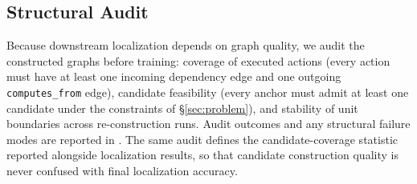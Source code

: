 \subsection{Structural Audit}
Because downstream localization depends on graph quality, we audit the constructed graphs before training: coverage of executed actions (every action must have at least one incoming dependency edge and one outgoing \texttt{computes\_from} edge), candidate feasibility (every anchor must admit at least one candidate under the constraints of \S\ref{sec:problem}), and stability of unit boundaries across re-construction runs. Audit outcomes and any structural failure modes are reported in . The same audit defines the candidate-coverage statistic reported alongside localization results, so that candidate construction quality is never confused with final localization accuracy.
